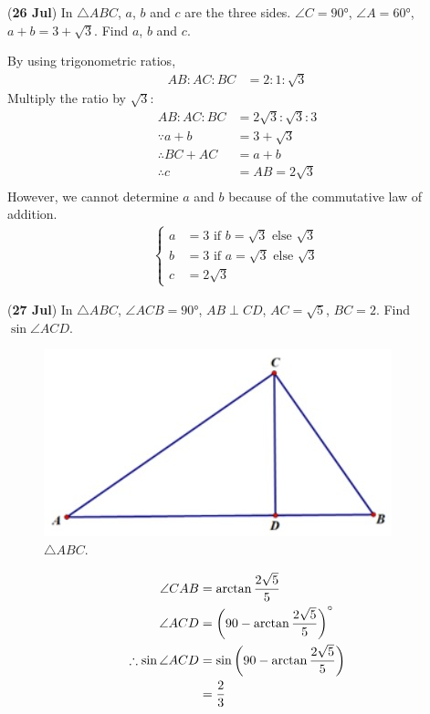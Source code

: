 \documentclass[12pt,answers]{exam}
\renewcommand{\frac}[2]{\dfrac{#1}{#2}}
\newcommand{\qndate}[2]{(\textbf{#1 #2})}
\begin{document}
\begin{questions}
	\question \qndate{26}{Jul} In $\triangle ABC$, $a$, $b$ and $c$ are the three sides.
	$\angle C = \ang{90}$, $\angle A = \ang{60}$, $a + b = 3 + \sqrt{3}$. Find $a$, $b$
	and $c$.
	\begin{solution}
		By using trigonometric ratios,
		\begin{align*}
			AB : AC : BC & = 2 : 1 : \sqrt{3}
		\end{align*}
		Multiply the ratio by $\sqrt{3}$:
		\begin{align*}
			AB : AC : BC       & = 2\sqrt{3} : \sqrt{3} : 3 \\
			\because a + b     & = 3 + \sqrt{3}             \\
			\therefore BC + AC & = a + b                    \\
			\therefore c       & = AB = 2\sqrt{3}           \\
		\end{align*}
		However, we cannot determine $a$ and $b$ because of the commutative law of addition.
		\begin{align*}
			\begin{cases}
				a & = 3 \text{ if } b = \sqrt{3} \text{ else } \sqrt{3} \\
				b & = 3 \text{ if } a = \sqrt{3} \text{ else } \sqrt{3} \\
				c & = 2\sqrt{3}
			\end{cases}
		\end{align*}
	\end{solution}

	\question \qndate{27}{Jul} In $\triangle ABC$, $\angle ACB = \ang{90}$, $AB \perp CD$,
	$AC = \sqrt{5}$, $BC = 2$. Find $\sin\angle ACD$.
	\begin{figure}[htpb]
		\centering
		\includegraphics[scale=.5]{images/0727_Tri.jpeg}
		\caption{$\triangle ABC$.}
		\label{fig:0727_Tri}
	\end{figure}
	\begin{solution}
		\begin{align*}
			\angle CAB                & = \arctan \frac{2\sqrt{5}}{5}                         \\
			\angle ACD                & = \left(90-\arctan \frac{2\sqrt{5}}{5}\right) \degree \\
			\therefore \sin\angle ACD & = \sin \left(90-\arctan \frac{2\sqrt{5}}{5}\right)    \\
			                          & = \frac{2}{3}
		\end{align*}
	\end{solution}


\end{questions}
\end{document}
